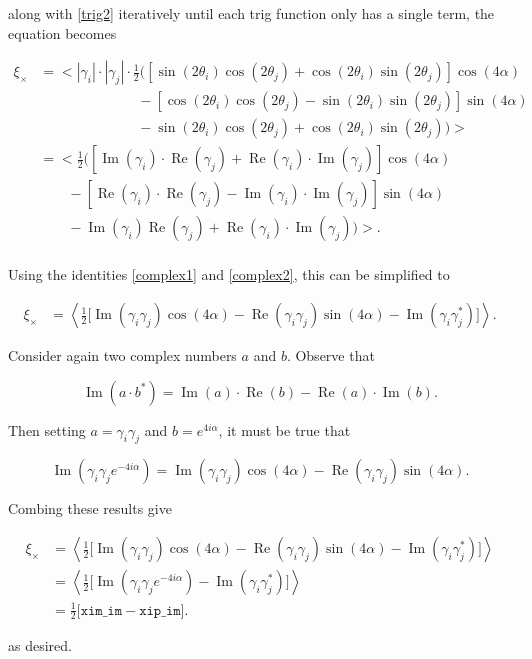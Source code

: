 \documentclass[%
 reprint,
 amsmath,amssymb,
 aps,
]{revtex4-1}
\begin{document}
along with \eqref{trig2} iteratively until each trig function only has a single term, the equation becomes

\begin{align*}
\xi_\times&=\Big<|\gamma_i|\cdot|\gamma_j|\cdot\frac{1}{2}\Big(\left[\sin(2\theta_i)\cos(2\theta_j)+\cos(2\theta_i)\sin(2\theta_j)\right]\cos(4\alpha)\\
&\qquad\qquad\qquad\quad-\left[\cos(2\theta_i)\cos(2\theta_j)-\sin(2\theta_i)\sin(2\theta_j)\right]\sin(4\alpha)\\
&\qquad\qquad\qquad\quad-\sin(2\theta_i)\cos(2\theta_j)+\cos(2\theta_i)\sin(2\theta_j)\Big)\Big>\\
&=\Big<\frac{1}{2}\Big(\left[\operatorname{Im}(\gamma_i)\cdot\operatorname{Re}(\gamma_j)+\operatorname{Re}(\gamma_i)\cdot\operatorname{Im}(\gamma_j)\right]\cos(4\alpha)\\
&\qquad-\left[\operatorname{Re}(\gamma_i)\cdot\operatorname{Re}(\gamma_j)-\operatorname{Im}(\gamma_i)\cdot\operatorname{Im}(\gamma_j)\right]\sin(4\alpha)\\
&\qquad-\operatorname{Im}(\gamma_i)\operatorname{Re}(\gamma_j)+\operatorname{Re}(\gamma_i)\cdot\operatorname{Im}(\gamma_j)\Big)\Big>.\\
\end{align*}

Using the identities \eqref{complex1} and \eqref{complex2}, this can be simplified to

\begin{align*}
\xi_\times&=\left<\frac{1}{2}\big[\operatorname{Im}(\gamma_i\gamma_j)\cos(4\alpha)-\operatorname{Re}(\gamma_i\gamma_j)\sin(4\alpha)-\operatorname{Im}(\gamma_i\gamma_j^*)\big]\right>.
\end{align*}

Consider again two complex numbers $a$ and $b$. Observe that

$$\operatorname{Im}(a\cdot b^*)=\operatorname{Im}(a)\cdot\operatorname{Re}(b)-\operatorname{Re}(a)\cdot\operatorname{Im}(b).$$

Then setting $a=\gamma_i\gamma_j$ and $b=e^{4i\alpha}$, it must be true that

$$\operatorname{Im}\left(\gamma_i\gamma_je^{-4i\alpha}\right)=\operatorname{Im}(\gamma_i\gamma_j)\cos(4\alpha)-\operatorname{Re}(\gamma_i\gamma_j)\sin(4\alpha).$$

Combing these results give

\begin{align*}
\xi_\times&=\left<\frac{1}{2}\big[\operatorname{Im}(\gamma_i\gamma_j)\cos(4\alpha)-\operatorname{Re}(\gamma_i\gamma_j)\sin(4\alpha)-\operatorname{Im}(\gamma_i\gamma_j^*)\big]\right>\\
&=\left<\frac{1}{2}\big[\operatorname{Im}\left(\gamma_i\gamma_je^{-4i\alpha}\right)-\operatorname{Im}(\gamma_i\gamma_j^*)\big]\right>\\
&=\frac{1}{2}\big[\texttt{xim\_im}-\texttt{xip\_im}\big].
\end{align*}

as desired.

\end{document}
